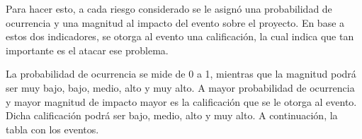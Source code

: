 Para hacer esto, a cada riesgo considerado se le asignó una probabilidad de ocurrencia y una magnitud al impacto del evento sobre el proyecto. En base a estos dos indicadores, se otorga al evento una calificación, la cual indica que tan importante es el atacar ese problema.

La probabilidad de ocurrencia se mide de 0 a 1, mientras que la magnitud podrá ser muy bajo, bajo, medio, alto y muy alto. A mayor probabilidad de ocurrencia y mayor magnitud de impacto mayor es la calificación que se le otorga al evento. Dicha calificación podrá ser bajo, medio, alto y muy alto. A continuación, la tabla con los eventos.

\small
\renewcommand{\arraystretch}{1.15}

\newcommand{\bajo}{\cellcolor{yellow!20}BAJO}
\newcommand{\medio}{\cellcolor{orange!25}MEDIO}
\newcommand{\alto}{\cellcolor{red!20}ALTO}
\newcommand{\muyalto}{\cellcolor{red!45}\textbf{MUY ALTO}}

